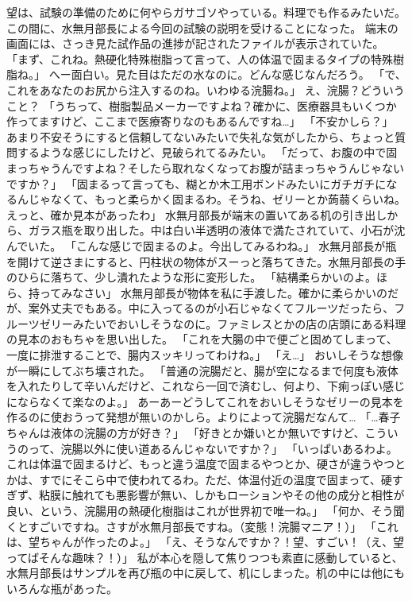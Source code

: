 望は、試験の準備のために何やらガサゴソやっている。料理でも作るみたいだ。
この間に、水無月部長による今回の試験の説明を受けることになった。
端末の画面には、さっき見た試作品の進捗が記されたファイルが表示されていた。
「まず、これね。熱硬化特殊樹脂って言って、人の体温で固まるタイプの特殊樹脂ね。」
へー面白い。見た目はただの水なのに。どんな感じなんだろう。
「で、これをあなたのお尻から注入するのね。いわゆる浣腸ね。」
え、浣腸？どういうこと？
「うちって、樹脂製品メーカーですよね？確かに、医療器具もいくつか作ってますけど、ここまで医療寄りなのもあるんですね…」
「不安かしら？」
あまり不安そうにすると信頼してないみたいで失礼な気がしたから、ちょっと質問するような感じにしたけど、見破られてるみたい。
「だって、お腹の中で固まっちゃうんですよね？そしたら取れなくなってお腹が詰まっちゃうんじゃないですか？」
「固まるって言っても、糊とか木工用ボンドみたいにガチガチになるんじゃなくて、もっと柔らかく固まるわ。そうね、ゼリーとか蒟蒻くらいね。えっと、確か見本があったわ」
水無月部長が端末の置いてある机の引き出しから、ガラス瓶を取り出した。中は白い半透明の液体で満たされていて、小石が沈んでいた。
「こんな感じで固まるのよ。今出してみるわね。」
水無月部長が瓶を開けて逆さまにすると、円柱状の物体がスーっと落ちてきた。水無月部長の手のひらに落ちて、少し潰れたような形に変形した。
「結構柔らかいのよ。ほら、持ってみなさい」
水無月部長が物体を私に手渡した。確かに柔らかいのだが、案外丈夫でもある。中に入ってるのが小石じゃなくてフルーツだったら、フルーツゼリーみたいでおいしそうなのに。ファミレスとかの店の店頭にある料理の見本のおもちゃを思い出した。
「これを大腸の中で便ごと固めてしまって、一度に排泄することで、腸内スッキリってわけね。」
「え…」
おいしそうな想像が一瞬にしてぶち壊された。
「普通の浣腸だと、腸が空になるまで何度も液体を入れたりして辛いんだけど、これなら一回で済むし、何より、下痢っぽい感じにならなくて楽なのよ。」
あーあーどうしてこれをおいしそうなゼリーの見本を作るのに使おうって発想が無いのかしら。よりによって浣腸だなんて…
「…春子ちゃんは液体の浣腸の方が好き？」
「好きとか嫌いとか無いですけど、こういうのって、浣腸以外に使い道あるんじゃないですか？」
「いっぱいあるわよ。これは体温で固まるけど、もっと違う温度で固まるやつとか、硬さが違うやつとかは、すでにそこら中で使われてるわ。ただ、体温付近の温度で固まって、硬すぎず、粘膜に触れても悪影響が無い、しかもローションやその他の成分と相性が良い、という、浣腸用の熱硬化樹脂はこれが世界初で唯一ね。」
「何か、そう聞くとすごいですね。さすが水無月部長ですね。（変態！浣腸マニア！）」
「これは、望ちゃんが作ったのよ。」
「え、そうなんですか？！望、すごい！（え、望ってばそんな趣味？！）」
私が本心を隠して焦りつつも素直に感動していると、水無月部長はサンプルを再び瓶の中に戻して、机にしまった。机の中には他にもいろんな瓶があった。
